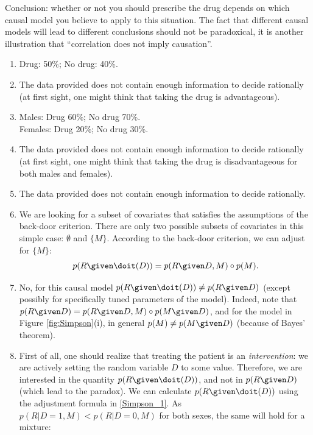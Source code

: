 \begin{enumerate}[label=8.\arabic*]
    Conclusion: whether or not you should prescribe the drug depends on which causal model you believe to apply to this situation.
    The fact that different causal models will lead to different conclusions should not be paradoxical, it is another illustration that
    ``correlation does not imply causation''.

    \begin{ungradedsolution}
        \begin{enumerate}
            \item Drug: 50\%; No drug: 40\%.
            \item The data provided does not contain enough information to decide rationally (at first sight, one might think that taking the drug is advantageous).
            \item Males: Drug 60\%; No drug 70\%.\\
            Females: Drug 20\%; No drug 30\%.
            \item  The data provided does not contain enough information to decide rationally (at first sight, one might think that taking the drug is disadvantageous for both males and females).
            \item The data provided does not contain enough information to decide rationally.
            \item We are looking for a subset of covariates that satisfies the assumptions of the back-door criterion. There are only two possible
            subsets of covariates in this simple case: $\emptyset$ and $\{M\}$. According to the back-door criterion, we can adjust for $\{M\}$:
            $$p(R \given \doit(D)) = p(R \given D, M) \circ p(M).$$
            \item No, for this causal model $p(R \given \doit(D)) \ne p(R \given D)$ (except possibly for specifically tuned parameters of the model). Indeed,
            note that $p(R \given D) = p(R \given D, M) \circ p(M \given D)$, and for the model in Figure \ref{fig:Simpson}(i), in general $p(M) \ne p(M \given D)$ (because of Bayes' theorem).
            \item First of all, one should realize that treating the patient is an \emph{intervention}: we are actively setting the random variable $D$ to some value.
            Therefore, we are interested in the quantity $p(R \given \doit(D))$, and not in $p(R \given D)$ (which lead to the paradox). We can calculate
            $p(R \given \doit(D))$ using the adjustment formula in \ref{Simpson_1}. As $p(R|D=1,M) < p(R|D=0,M)$ for both sexes, the same will hold for a mixture:

\end{enumerate}
\end{ungradedsolution}
\end{enumerate}
